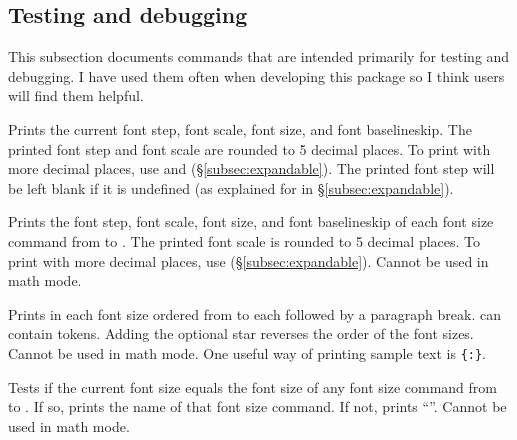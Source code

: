 \documentclass{beery}
\begin{document}
\subsection{Testing and debugging}
\label{subsec:debug}

This subsection documents commands that are intended primarily for testing and debugging.
I have used them often when developing this package so I think users will find them helpful.

\begin{mydisplaycode}
\end{mydisplaycode}

Prints the current font step, font scale, font size, and font baselineskip.
The printed font step and font scale are rounded to \num{5} decimal places.
To print with more decimal places, use  and  (\S\ref{subsec:expandable}).
The printed font step will be left blank if it is undefined (as explained for  in \S\ref{subsec:expandable}).

\begin{mydisplaycode}
\end{mydisplaycode}

Prints the font step, font scale, font size, and font baselineskip of each font size command from  to .
The printed font scale is rounded to \num{5} decimal places.
To print with more decimal places, use  (\S\ref{subsec:expandable}).
Cannot be used in math mode.

\begin{mydisplaycode}
   \sarg{} 
\end{mydisplaycode}

Prints  in each font size ordered from  to  each followed by a paragraph break.
 can contain  tokens.
Adding the optional star \sarg{} reverses the order of the font sizes.
Cannot be used in math mode.
One useful way of printing sample text is \allowbreak\texttt{\{:\allowbreak\textvisiblespace\allowbreak{}\}}.

\begin{mydisplaycode}
\end{mydisplaycode}

Tests if the current font size equals the font size of any font size command from  to .
If so, prints the name of that font size command.
If not, prints \enquote{\string\undefined}.
Cannot be used in math mode.
\end{document}
